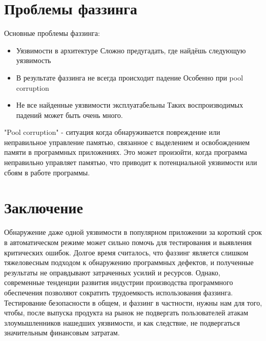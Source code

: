 \documentclass[areasetadvanced]{scrartcl}
\begin{document}
\section{Проблемы фаззинга}
Основные проблемы фаззинга:
\begin{itemize}
    \item Уязвимости в архитектуре
    \subitem Сложно предугадать, где найдёшь следующую уязвимость
    \item В результате фаззинга не всегда происходит падение
    \subitem Особенно при pool corruption
    \item Не все найденные уязвимости эксплуатабельны
    \subitem Таких воспроизводимых падений может быть очень много.
\end{itemize}

"Pool corruption" - ситуация когда обнаруживается повреждение или неправильное управление
памятью, связанное с выделением и освобождением памяти в программных приложениях.
Это может произойти, когда программа неправильно управляет памятью, что приводит к
потенциальной уязвимости или сбоям в работе программы.
\newpage
\section*{Заключение}
Обнаружение даже одной уязвимости в популярном приложении за короткий срок в
автоматическом режиме может сильно помочь для тестирования и выявления критических
ошибок. Долгое время считалось, что фаззинг является слишком тяжеловесным подходом к
обнаружению программных дефектов, и полученные результаты не оправдывают затраченных
усилий и ресурсов. Однако, современные тенденции развития индустрии производства
программного обеспечения позволяют сократить трудоемкость использования фаззинга.
Тестирование безопасности в общем, и фаззинг в частности, нужны нам для того, чтобы, после
выпуска продукта на рынок не подвергать пользователей атакам злоумышленников нашедших
уязвимости, и как следствие, не подвергаться значительным финансовым затратам.
\end{document}
